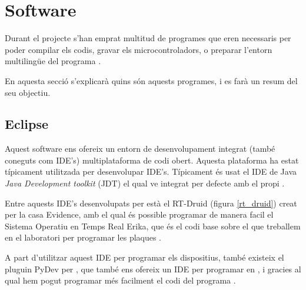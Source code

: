 \section{Software}\label{cap:tec:soft}

Durant el projecte s'han emprat multitud de programes que eren necessaris per poder compilar els codis, gravar els microcontroladors, o preparar l'entorn multilingüe del programa \DCSMonitor.

En aquesta secció s'explicarà quins són aquests programes, i es farà un resum del seu objectiu.

\subsection{Eclipse}\label{cap:tec:soft:eclipse}


Aquest software ens ofereix un entorn de desenvolupament integrat (també coneguts com IDE's) multiplataforma de codi obert. Aquesta plataforma ha estat típicament utilitzada per desenvolupar IDE's. Típicament és usat el IDE de Java \emph{Java Development toolkit} (JDT) el qual ve integrat per defecte amb el propi \Eclipse.

Entre aquests IDE's desenvolupats per \Eclipse està el RT-Druid (figura \ref{rt_druid}) creat per la casa Evidence, amb el qual és possible programar de manera facil el Sistema Operatiu en Temps Real Erika, que és el codi base sobre el que treballem en el laboratori per programar les plaques \FLEX.


A part d'utilitzar aquest IDE per programar els dispositius, també existeix el pluguin PyDev per \Eclipse, que també ens ofereix un IDE per programar en \Python, i gracies al qual hem pogut programar més facilment el codi del programa \DCSMonitor.



